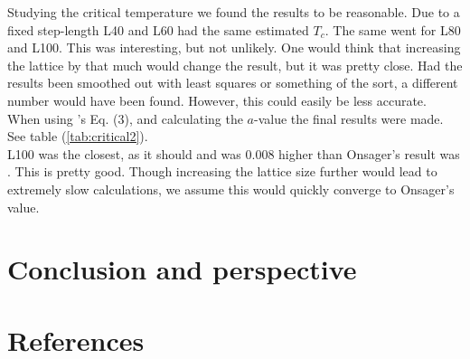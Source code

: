 \documentclass{article}
\begin{document}


Studying the critical temperature we found the results to be reasonable. Due to a fixed step-length L40 and L60 had the same estimated $T_c$. The same went for L80 and L100. This was interesting, but not unlikely. One would think that increasing the lattice by that much would change the result, but it was pretty close. Had the results been smoothed out with least squares or something of the sort, a different number would have been found. However, this could easily be less accurate. When using \cite{task}'s Eq. (3), and calculating the $a$-value the final results were made. See table (\ref{tab:critical2}). \\

L100 was the closest, as it should and was 0.008 higher than Onsager's result was \cite{onsager}. This is pretty good.
Though increasing the lattice size further would lead to extremely slow calculations, we assume this would quickly converge to Onsager's value. \\
\fi

\vspace{1cm}

\section{Conclusion and perspective} \label{sec:Conclusion}

\iffalse
In this project we have studied the convergence rate using the Ising model, evaluated the acceptance, and seen how the probability distribution looks. We also looked into the point in which phase transition occurs. This was calculated by use of equations from \ref{sec:criticaltemp}. This combined with simulations of the lattice with different sizes gave an approximated value. The results show that the phase transition occured around $T=2.27$ (scaled of course).
\fi


\vspace{1cm}

\section{References} \label{sec:References}
\end{document}
